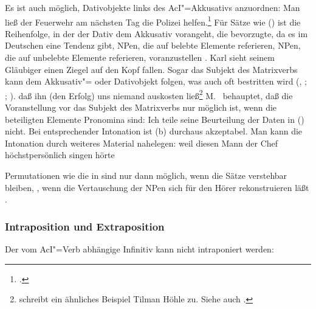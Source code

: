 \noindent
Es ist auch möglich, Dativobjekte links des AcI"=Akkusativs anzuordnen:
\ea Man ließ der Feuerwehr           am     nächsten Tag die Polizei      helfen.\footnote{
        .
      }
\z
Für Sätze wie () ist die Reihenfolge, in der der Dativ dem Akkusativ vorangeht,
die bevorzugte, da es im Deutschen eine Tendenz gibt, NPen, die auf belebte Elemente referieren,
NPen, die auf unbelebte Elemente referieren, voranzustellen \citep*[]{Hoberg81a}.
\ea
Karl sieht seinem Gläubiger einen Ziegel auf den Kopf fallen.\label{fallen-sehen}
\z
%
Sogar das Subjekt des Matrixverbs kann dem Akkusativ"= oder Dativobjekt folgen,
was auch oft bestritten wird (\citealp[]{Grewendorf87a},
\citealp*[]{Grewendorf88a}; \citealp[]{Wurmbrand98a};
\citealp[, 306]{Cook2001a}).
\ea
daß  ihn      (den Erfolg) uns      niemand      auskosten ließ\footnote{
        \citet*[]{Haider91} schreibt ein ähnliches Beispiel
        Tilman Höhle zu. Siehe auch .
}
\z
M.\ \citet[]{MRichter2002b} behauptet, daß die Voranstellung vor das Subjekt des Matrixverbs
nur möglich ist, wenn die beteiligten Elemente Pronomina sind:
\eal
{}
\zl
Ich teile seine Beurteilung der Daten in () nicht. Bei entsprechender Intonation
ist (b) durchaus akzeptabel. Man kann die Intonation durch weiteres Material nahelegen:
\ea
weil diesen Mann der Chef höchstpersönlich singen hörte
\z

\noindent
Permutationen wie die in  sind nur dann
möglich, wenn die Sätze verstehbar bleiben, \dash, wenn die Vertauschung der NPen sich für den Hörer
rekonstruieren läßt \citep[]{Mueller99a}. 


\subsubsection{Intraposition und Extraposition}
\label{sec-aci-ie}

Der vom AcI"=Verb abhängige Infinitiv kann nicht intraponiert werden:
\eal
{}
\zl

